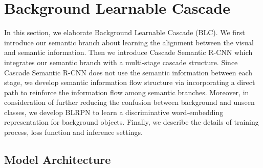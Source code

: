\documentclass[runningheads]{llncs}
\begin{document}
\section{Background Learnable Cascade}
In this section, we elaborate Background Learnable Cascade (BLC). We first introduce our semantic branch about learning the alignment between the visual and semantic information. Then we introduce Cascade Semantic R-CNN which integrates our semantic branch with a multi-stage cascade structure. Since Cascade Semantic R-CNN does not use the semantic information between each stage, we develop semantic information flow structure via incorporating a direct path to reinforce the information flow among semantic branches. Moreover, in consideration of further reducing the confusion between background and unseen classes, we develop BLRPN to learn a discriminative word-embedding representation for background objects. Finally, we describe the details of training process, loss function and inference settings.
\subsection{Model Architecture}
\end{document}
